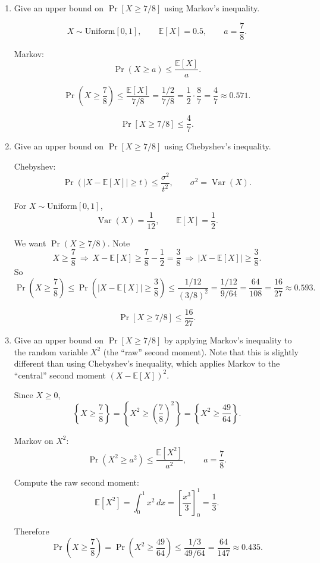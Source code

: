 \documentclass[10pt]{article}
\newcommand{\spara}[1]{\vspace{.5em}\noindent {\large\sffamily\textcolor{nyuOfficialPurple}{#1}}}
\newcommand{\E}{\mathbb{E}}
\DeclareMathOperator{\Var}{Var}
\begin{document}
\begin{enumerate}[label=\arabic*.]
	\item Give an upper bound on $\Pr[X \geq 7/8]$ using Markov's inequality.

\spara{Pr. 1.1}

\[
X\sim \text{Uniform}[0,1],
\qquad
\E[X]=0.5,
\qquad
a=\frac{7}{8}.
\]

Markov:
\[
\Pr(X\ge a)\le \frac{\E[X]}{a}.
\]

\[
\Pr\!\left(X\ge \frac{7}{8}\right)
\le
\frac{\E[X]}{7/8}
=
\frac{1/2}{7/8}
=
\frac{1}{2}\cdot \frac{8}{7}
=
\frac{4}{7}
\approx 0.571.
\]

\[
\boxed{\Pr[X\ge 7/8]\le \frac{4}{7}.}
\]


	\item Give an upper bound on $\Pr[X \geq 7/8]$ using Chebyshev's inequality.

\spara{Pr. 1.2}

Chebyshev:
\[
\Pr(|X-\E[X]|\ge t)\le \frac{\sigma^2}{t^2},
\qquad
\sigma^2=\Var(X).
\]

For $X\sim \text{Uniform}[0,1]$,
\[
\Var(X)=\frac{1}{12},
\qquad
\E[X]=\frac{1}{2}.
\]

We want $\Pr(X\ge 7/8)$. Note
\[
X\ge \frac{7}{8}
\ \Rightarrow\
X-\E[X]\ge \frac{7}{8}-\frac{1}{2}=\frac{3}{8}
\ \Rightarrow\
|X-\E[X]|\ge \frac{3}{8}.
\]
So
\[
\Pr\!\left(X\ge \frac{7}{8}\right)
\le
\Pr\!\left(|X-\E[X]|\ge \frac{3}{8}\right)
\le
\frac{1/12}{(3/8)^2}
=
\frac{1/12}{9/64}
=
\frac{64}{108}
=
\frac{16}{27}
\approx 0.593.
\]

\[
\boxed{\Pr[X\ge 7/8]\le \frac{16}{27}.}
\]


	\item Give an upper bound on $\Pr[X \geq 7/8]$ by applying Markov's inequality to the random variable $X^2$ (the ``raw'' second moment). Note that this is slightly different than using Chebyshev's inequality, which applies Markov to the ``central'' second moment $(X - \E[X])^2$.

\spara{Pr. 1.3}

Since $X\ge 0$,
\[
\left\{X\ge \frac{7}{8}\right\}
=
\left\{X^2 \ge \left(\frac{7}{8}\right)^2\right\}
=
\left\{X^2 \ge \frac{49}{64}\right\}.
\]

Markov on $X^2$:
\[
\Pr(X^2\ge a^2)\le \frac{\E[X^2]}{a^2},
\qquad
a=\frac{7}{8}.
\]

Compute the raw second moment:
\[
\E[X^2]=\int_0^1 x^2\,dx
=
\left[\frac{x^3}{3}\right]_0^1
=
\frac{1}{3}.
\]

Therefore
\[
\Pr\!\left(X\ge \frac{7}{8}\right)
=
\Pr\!\left(X^2\ge \frac{49}{64}\right)
\le
\frac{1/3}{49/64}
=
\frac{64}{147}
\approx 0.435.
\]


\end{enumerate}
\end{document}
